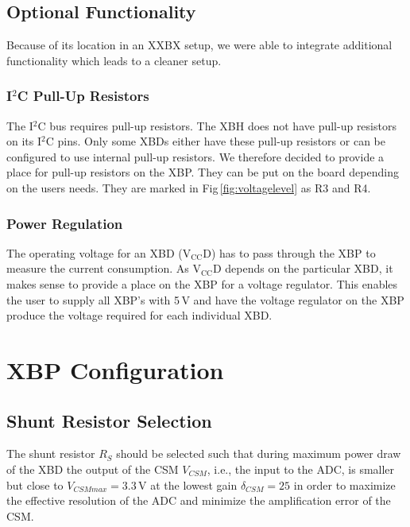 \documentclass[twoside,11pt]{cergdoc}
\begin{document}
\section{Optional Functionality}
Because of its location in an XXBX setup, we were able to integrate additional 
functionality which leads to a cleaner setup.

\subsection{I$^2$C Pull-Up Resistors}
The I$^2$C bus requires pull-up resistors. The XBH does not have pull-up resistors on 
its I$^2$C pins. Only some XBDs either have these pull-up
resistors or can be configured to use internal pull-up resistors. We therefore decided
to provide a place for pull-up resistors on the XBP. They can be put on the board 
depending on the users needs. They are marked in Fig\,\ref{fig:voltagelevel} as R3 and R4.

\subsection{Power Regulation}
The operating voltage for an XBD ($\mathrm{V_{CC}D}$) has to pass through the XBP to measure the 
current consumption. As $\mathrm{V_{CC}D}$ depends on the particular XBD,
it makes sense to provide a place on the XBP for a voltage regulator. This 
enables the user to supply all XBP's with 5\,V and have the voltage regulator
on the XBP produce the voltage required for each individual XBD.

\chapter{XBP Configuration}

\section{Shunt Resistor Selection}
The shunt resistor $R_S$ should be selected such that during maximum power draw of the XBD 
the output of the CSM $V_{CSM}$, i.e., the
input to the ADC,  is smaller but close to $V_{CSMmax}=3.3\,\mathrm{V}$ at 
the lowest gain $\delta_{CSM} = 25$ in order to maximize the effective resolution
of the ADC and minimize the amplification error of the CSM. 
\end{document}
